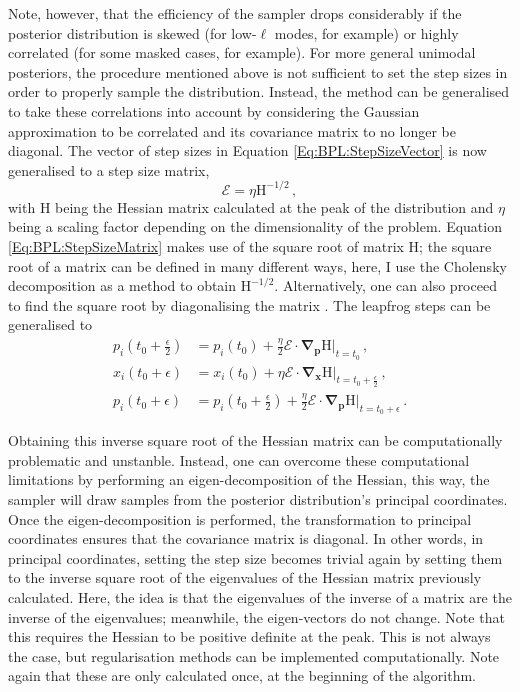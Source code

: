 \qquad Note, however, that the efficiency of the sampler drops considerably if the posterior distribution is skewed (for low-$\ell$ modes, for example) or highly correlated (for some masked cases, for example). For more general unimodal posteriors, the procedure mentioned above is not sufficient to set the step sizes in order to properly sample the distribution. Instead, the method can be generalised to take these correlations into account by considering the Gaussian approximation to be correlated and its covariance matrix to no longer be diagonal. The vector of step sizes in Equation \ref{Eq:BPL:StepSizeVector} is now generalised to a step size matrix, 
\begin{equation}
    \label{Eq:BPL:StepSizeMatrix}
    \bm{\mathcal{E}} = \eta \bm{\mathrm{H}}^{-1/2}\, ,
\end{equation}
with $\bm{\mathrm{H}}$ being the Hessian matrix calculated at the peak of the distribution and $\eta$ being a scaling factor depending on the dimensionality of the problem. Equation \ref{Eq:BPL:StepSizeMatrix} makes use of the square root of matrix $\bm{\mathrm{H}}$; the square root of a matrix can be defined in many different ways, here, I use the Cholensky decomposition \citep{Golub1996} as a method to obtain $\bm{\mathrm{H}}^{-1/2}$. Alternatively, one can also proceed to find the square root by diagonalising the matrix \citep{SreeThesis}.  The leapfrog steps can be generalised to
\begin{align}
\label{eqn::ch1_leap_forg_matrix_1}
p_i\left(t_0+\frac{\epsilon}{2}\right) & = p_i(t_0)+\frac{\eta}{2}\bm{\mathcal{E}}\cdot\mathbf{\nabla}_{\mathbf{p}}\bm{\mathrm{H}}\Big|_{t=t_0} \, ,\\
\label{eqn::ch1_leap_forg_matrix_2}
x_i(t_0+\epsilon) &= x_i(t_0)+\eta\bm{\mathcal{E}}\cdot\mathbf{\nabla}_{\mathbf{x}}\bm{\mathrm{H}}\Big|_{t=t_0+\frac{\epsilon}{2} }\, ,\\
\label{eqn::ch1_leap_forg_matrix_3}
p_i(t_0+\epsilon) & = p_i\left(t_0+\frac{\epsilon}{2}\right)+\frac{\eta}{2}\bm{\mathcal{E}}\cdot\mathbf{\nabla}_{\mathbf{p}}\bm{\mathrm{H}}\Big|_{t=t_0+\epsilon}\, .
\end{align}

\qquad Obtaining this inverse square root of the Hessian matrix can be computationally problematic and unstanble. Instead, one can overcome these computational limitations by performing an eigen-decomposition of the Hessian, this way, the sampler will draw samples from the posterior distribution's principal coordinates. Once the eigen-decomposition is performed, the transformation to principal coordinates ensures that the covariance matrix is diagonal. In other words, in principal coordinates, setting the step size becomes trivial again by setting them to the inverse square root of the eigenvalues of the Hessian matrix previously calculated. Here, the idea is that the eigenvalues of the inverse of a matrix are the inverse of the eigenvalues; meanwhile, the eigen-vectors do not change. Note that this requires the Hessian to be positive definite at the peak. This is not always the case, but regularisation methods can be implemented computationally. Note again that these are only calculated once, at the beginning of the algorithm.

